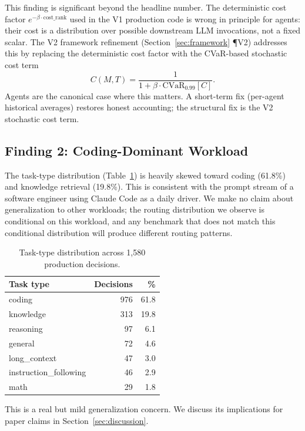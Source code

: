 This finding is significant beyond the headline number. The deterministic cost factor $e^{-\beta \cdot \text{cost\_rank}}$ used in the V1 production code is wrong in principle for agents: their cost is a distribution over possible downstream LLM invocations, not a fixed scalar. The V2 framework refinement (Section~\ref{sec:framework} ¶V2) addresses this by replacing the deterministic cost factor with the CVaR-based stochastic cost term
\[
C(M, T) = \frac{1}{1 + \beta \cdot \text{CVaR}_{0.99}[C]}.
\]
Agents are the canonical case where this matters. A short-term fix (per-agent historical averages) restores honest accounting; the structural fix is the V2 stochastic cost term.

\subsection{Finding 2: Coding-Dominant Workload}

The task-type distribution (Table~\ref{tab:prod_task_distribution}) is heavily skewed toward coding (61.8\%) and knowledge retrieval (19.8\%). This is consistent with the prompt stream of a software engineer using Claude Code as a daily driver. We make no claim about generalization to other workloads; the routing distribution we observe is conditional on this workload, and any benchmark that does not match this conditional distribution will produce different routing patterns.

\begin{table}[h]
\centering
\caption{Task-type distribution across 1{,}580 production decisions.}
\label{tab:prod_task_distribution}
\small
\begin{tabular}{lrr}
\toprule
\textbf{Task type} & \textbf{Decisions} & \textbf{\%} \\
\midrule
coding & 976 & 61.8 \\
knowledge & 313 & 19.8 \\
reasoning & 97 & 6.1 \\
general & 72 & 4.6 \\
long\_context & 47 & 3.0 \\
instruction\_following & 46 & 2.9 \\
math & 29 & 1.8 \\
\bottomrule
\end{tabular}
\end{table}

This is a real but mild generalization concern. We discuss its implications for paper claims in Section~\ref{sec:discussion}.

